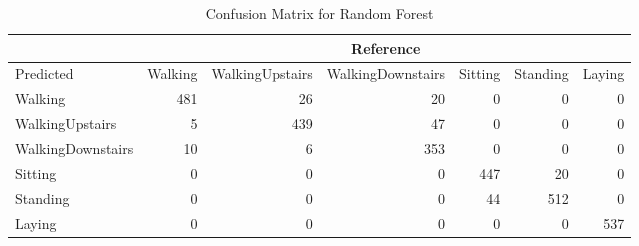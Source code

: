\begin{table}[ht]
\centering
\caption{Confusion Matrix for Random Forest} 
\label{tab:conmat_rf}
\begin{tabular}{l|rrrrrr}
  &\multicolumn{6}{c}{Reference}\\
 \hline
Predicted & Walking & WalkingUpstairs & WalkingDownstairs & Sitting & Standing & Laying \\ 
  \hline
Walking & 481 &  26 &  20 &   0 &   0 &   0 \\ 
  WalkingUpstairs &   5 & 439 &  47 &   0 &   0 &   0 \\ 
  WalkingDownstairs &  10 &   6 & 353 &   0 &   0 &   0 \\ 
  Sitting &   0 &   0 &   0 & 447 &  20 &   0 \\ 
  Standing &   0 &   0 &   0 &  44 & 512 &   0 \\ 
  Laying &   0 &   0 &   0 &   0 &   0 & 537 \\ 
   \hline
\end{tabular}
\end{table}
